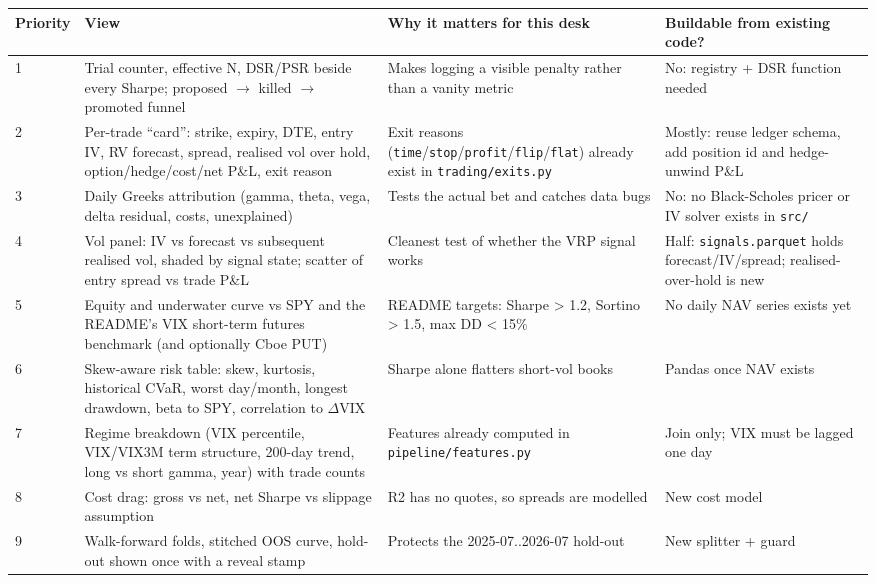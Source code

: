\documentclass{article}
\begin{document}
\begin{center}\small
\begin{tabularx}{\linewidth}{l >{\raggedright\arraybackslash}X >{\raggedright\arraybackslash}X >{\raggedright\arraybackslash}X}
\toprule
\textbf{Priority} & \textbf{View} & \textbf{Why it matters for this desk} & \textbf{Buildable from existing code?} \\
\midrule
1 & Trial counter, effective N, DSR/\allowbreak{}PSR beside every Sharpe; proposed \ensuremath{\rightarrow} killed \ensuremath{\rightarrow} promoted funnel & Makes logging a visible penalty rather than a vanity metric & No: registry + DSR function needed \\
2 & Per-trade ``card'': strike, expiry, DTE, entry IV, RV forecast, spread, realised vol over hold, option/\allowbreak{}hedge/\allowbreak{}cost/\allowbreak{}net P\&L, exit reason & Exit reasons (\texttt{time}/\allowbreak{}\texttt{stop}/\allowbreak{}\texttt{profit}/\allowbreak{}\texttt{flip}/\allowbreak{}\texttt{flat}) already exist in \texttt{trading/\allowbreak{}exits.\allowbreak{}py} & Mostly: reuse ledger schema, add position id and hedge-unwind P\&L \\
3 & Daily Greeks attribution (gamma, theta, vega, delta residual, costs, unexplained) & Tests the actual bet and catches data bugs & No: no Black-Scholes pricer or IV solver exists in \texttt{src/\allowbreak{}} \\
4 & Vol panel: IV vs forecast vs subsequent realised vol, shaded by signal state; scatter of entry spread vs trade P\&L & Cleanest test of whether the VRP signal works & Half: \texttt{signals.\allowbreak{}parquet} holds forecast/\allowbreak{}IV/\allowbreak{}spread; realised-over-hold is new \\
5 & Equity and underwater curve vs SPY and the README's VIX short-term futures benchmark (and optionally Cboe PUT) & README targets: Sharpe > 1.2, Sortino > 1.5, max DD < 15\% & No daily NAV series exists yet \\
6 & Skew-aware risk table: skew, kurtosis, historical CVaR, worst day/\allowbreak{}month, longest drawdown, beta to SPY, correlation to \ensuremath{\Delta}VIX & Sharpe alone flatters short-vol books & Pandas once NAV exists \\
7 & Regime breakdown (VIX percentile, VIX/\allowbreak{}VIX3M term structure, 200-day trend, long vs short gamma, year) with trade counts & Features already computed in \texttt{pipeline/\allowbreak{}features.\allowbreak{}py} & Join only; VIX must be lagged one day \\
8 & Cost drag: gross vs net, net Sharpe vs slippage assumption & R2 has no quotes, so spreads are modelled & New cost model \\
9 & Walk-forward folds, stitched OOS curve, hold-out shown once with a reveal stamp & Protects the 2025-07..2026-07 hold-out & New splitter + guard \\
\bottomrule
\end{tabularx}
\end{center}
\end{document}
